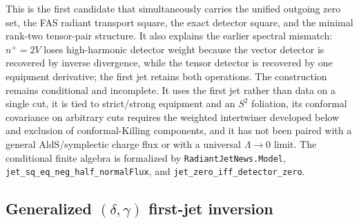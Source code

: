 \documentclass[11pt,a4paper]{article}
\begin{document}
This is the first candidate that simultaneously carries the unified outgoing zero set, the FAS radiant transport square, the exact detector square, and the minimal rank-two tensor-pair structure.  It also explains the earlier spectral mismatch: \(n^+=2V\) loses high-harmonic detector weight because the vector detector is recovered by inverse divergence, while the tensor detector is recovered by one equipment derivative; the first jet retains both operations.  The construction remains conditional and incomplete.  It uses the first jet rather than data on a single cut, it is tied to strict/strong equipment and an \(S^2\) foliation, its conformal covariance on arbitrary cuts requires the weighted intertwiner developed below and exclusion of conformal-Killing components, and it has not been paired with a general AldS/symplectic charge flux or with a universal \(\Lambda\to0\) limit.  The conditional finite algebra is formalized by \texttt{RadiantJetNews.Model}, \texttt{jet\_sq\_eq\_neg\_half\_normalFlux}, and \texttt{jet\_zero\_iff\_detector\_zero}.

\subsection{Generalized \((\delta,\gamma)\) first-jet inversion}
\end{document}
